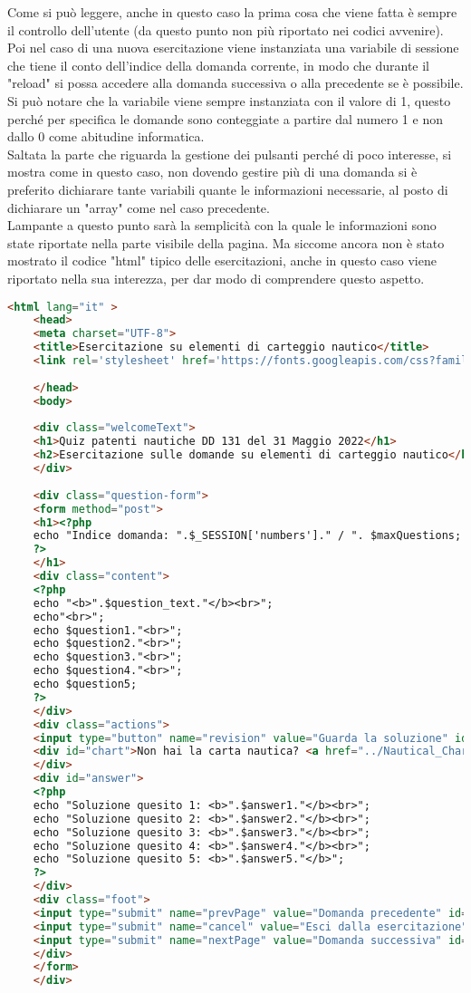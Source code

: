 Come si può leggere, anche in questo caso la prima cosa che viene fatta è sempre il controllo dell'utente (da questo punto non più riportato nei codici avvenire).  Poi nel caso di una nuova esercitazione viene instanziata una variabile di sessione che tiene il conto dell'indice della domanda corrente, in modo che durante il "reload" si possa accedere alla domanda successiva o alla precedente se è possibile. Si può notare che la variabile viene sempre instanziata con il valore di 1, questo perché per specifica le domande sono conteggiate a partire dal numero 1 e non dallo 0 come abitudine informatica.\\
Saltata la parte che riguarda la gestione dei pulsanti perché di poco interesse, si mostra come in questo caso, non dovendo gestire più di una domanda si è preferito dichiarare tante variabili quante le informazioni necessarie, al posto di dichiarare un "array" come nel caso precedente.\\
Lampante a questo punto sarà la semplicità con la quale le informazioni sono state riportate nella parte visibile della pagina. Ma siccome ancora non è stato mostrato il codice "html" tipico delle esercitazioni, anche in questo caso viene riportato nella sua interezza, per dar modo di comprendere questo aspetto.\\

\begin{lstlisting}[language=html]
	<html lang="it" >
	<head>
	<meta charset="UTF-8">
	<title>Esercitazione su elementi di carteggio nautico</title>
	<link rel='stylesheet' href='https://fonts.googleapis.com/css?family=Rubik:400,700'><link rel="stylesheet" href="exerciseStyle.css">
	
	</head>
	<body>  
	
	<div class="welcomeText">
	<h1>Quiz patenti nautiche DD 131 del 31 Maggio 2022</h1>
	<h2>Esercitazione sulle domande su elementi di carteggio nautico</h2>
	</div>
	
	<div class="question-form">
	<form method="post">
	<h1><?php
	echo "Indice domanda: ".$_SESSION['numbers']." / ". $maxQuestions;
	?>
	</h1>
	<div class="content">
	<?php 
	echo "<b>".$question_text."</b><br>";
	echo"<br>";
	echo $question1."<br>";
	echo $question2."<br>";
	echo $question3."<br>";
	echo $question4."<br>";
	echo $question5;
	?> 
	</div>
	<div class="actions">
	<input type="button" name="revision" value="Guarda la soluzione" id="revision" onclick="check()"/>
	<div id="chart">Non hai la carta nautica? <a href="../Nautical_Charts/Carta_Nautica_5D.pdf" download> Scaricala qui</a></div>
	</div>
	<div id="answer">
	<?php
	echo "Soluzione quesito 1: <b>".$answer1."</b><br>";
	echo "Soluzione quesito 2: <b>".$answer2."</b><br>";
	echo "Soluzione quesito 3: <b>".$answer3."</b><br>";
	echo "Soluzione quesito 4: <b>".$answer4."</b><br>";
	echo "Soluzione quesito 5: <b>".$answer5."</b>";
	?>
	</div>
	<div class="foot">
	<input type="submit" name="prevPage" value="Domanda precedente" id="button3"/>
	<input type="submit" name="cancel" value="Esci dalla esercitazione" id="button2"/>
	<input type="submit" name="nextPage" value="Domanda successiva" id="button1"/>
	</div>
	</form>
	</div>
\end{lstlisting}

